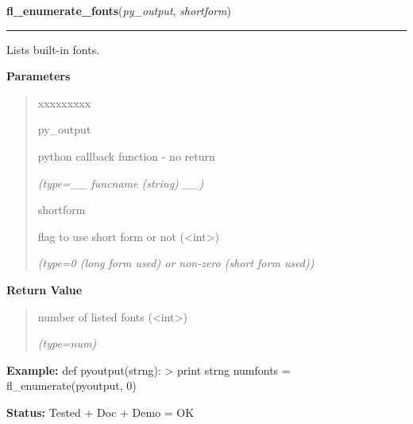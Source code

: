 \hspace{.8\funcindent}\begin{boxedminipage}{\funcwidth}

    \raggedright \textbf{fl\_enumerate\_fonts}(\textit{py\_output}, \textit{shortform})

    \vspace{-1.5ex}

    \rule{\textwidth}{0.5\fboxrule}
\setlength{\parskip}{2ex}
    Lists built-in fonts.

\setlength{\parskip}{1ex}
      \textbf{Parameters}
      \vspace{-1ex}

      \begin{quote}
        \begin{Ventry}{xxxxxxxxx}

          \item[py\_output]

          python callback function - no return

            {\it (type=\_\_ funcname (string) \_\_)}

          \item[shortform]

          flag to use short form or not ({\textless}int{\textgreater})

            {\it (type=0 (long form used) or non-zero (short form used))}

        \end{Ventry}

      \end{quote}

      \textbf{Return Value}
    \vspace{-1ex}

      \begin{quote}
      number of listed fonts ({\textless}int{\textgreater})

      {\it (type=num)}

      \end{quote}

\textbf{Example:} def pyoutput(strng): {\textgreater} print strng numfonts = 
fl\_enumerate(pyoutput, 0)



\textbf{Status:} Tested + Doc + Demo = OK



    \end{boxedminipage}

    \label{xformslib:library:fl_set_font_name}

